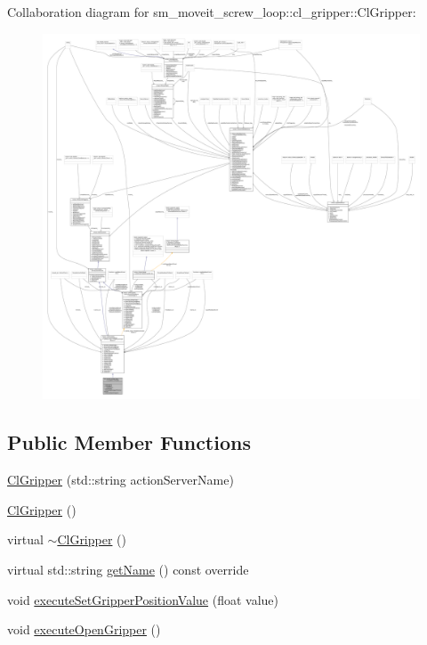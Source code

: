 Collaboration diagram for sm\+\_\+moveit\+\_\+screw\+\_\+loop\+:\+:cl\+\_\+gripper\+:\+:Cl\+Gripper\+:
\nopagebreak
\begin{figure}[H]
\begin{center}
\leavevmode
\includegraphics[width=350pt]{classsm__moveit__screw__loop_1_1cl__gripper_1_1ClGripper__coll__graph}
\end{center}
\end{figure}
\subsection*{Public Member Functions}
\begin{DoxyCompactItemize}
\item 
\hyperlink{classsm__moveit__screw__loop_1_1cl__gripper_1_1ClGripper_ac58ca1508a814f5960c82c9796e5d739}{Cl\+Gripper} (std\+::string action\+Server\+Name)
\item 
\hyperlink{classsm__moveit__screw__loop_1_1cl__gripper_1_1ClGripper_a32427f24f6dad8726c667565609262e2}{Cl\+Gripper} ()
\item 
virtual \hyperlink{classsm__moveit__screw__loop_1_1cl__gripper_1_1ClGripper_addf5871aab012d7cd7ff785232b47334}{$\sim$\+Cl\+Gripper} ()
\item 
virtual std\+::string \hyperlink{classsm__moveit__screw__loop_1_1cl__gripper_1_1ClGripper_a72e4e06d572de908077cf2fde2c92a5c}{get\+Name} () const override
\item 
void \hyperlink{classsm__moveit__screw__loop_1_1cl__gripper_1_1ClGripper_a097a0ac9c0404c11e2be045b328e31c7}{execute\+Set\+Gripper\+Position\+Value} (float value)
\item 
void \hyperlink{classsm__moveit__screw__loop_1_1cl__gripper_1_1ClGripper_a70c955e565252f37c4bf306d0ee50deb}{execute\+Open\+Gripper} ()
\end{DoxyCompactItemize}
